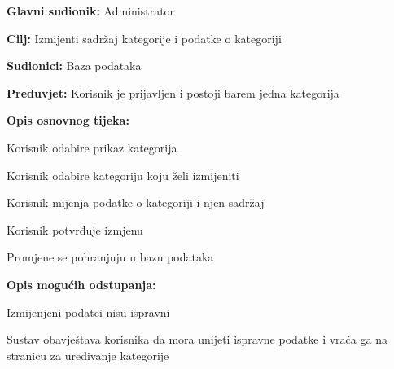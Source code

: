 					\noindent {}
					\begin{packed_item}
						
						\item \textbf{Glavni sudionik:} Administrator
						\item  \textbf{Cilj:} Izmijenti sadržaj kategorije i podatke o kategoriji
						\item  \textbf{Sudionici:} Baza podataka
						\item  \textbf{Preduvjet:} Korisnik je prijavljen i postoji barem jedna kategorija
						\item  \textbf{Opis osnovnog tijeka:}
						
						\item[] \begin{packed_enum}
							
							\item Korisnik odabire prikaz kategorija
							\item Korisnik odabire kategoriju koju želi izmijeniti
							\item Korisnik mijenja podatke o kategoriji i njen sadržaj
							\item Korisnik potvrđuje izmjenu
							\item Promjene se pohranjuju u bazu podataka
							
						\end{packed_enum}
						
						\item  \textbf{Opis mogućih odstupanja:}
						
						\item[] \begin{packed_item}
							
							\item[4.a] Izmijenjeni podatci nisu ispravni 
							\item[] \begin{packed_enum}
								
								\item Sustav obavještava korisnika da mora unijeti ispravne podatke i vraća ga na stranicu za uređivanje kategorije
								
							\end{packed_enum}
							
						\end{packed_item}
						
					\end{packed_item}
				
